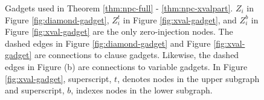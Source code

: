 \begin{figure}

	\caption{Gadgets used in Theorem \ref{thm:npc-full} - \ref{thm:npc-xvalpart}. $Z_i$ in Figure \ref{fig:diamond-gadget}, $Z_i^t$ in Figure \ref{fig:xval-gadget}, and $Z_i^b$ in Figure \ref{fig:xval-gadget} are the only zero-injection nodes.
	The dashed edges in Figure \ref{fig:diamond-gadget} and Figure \ref{fig:xval-gadget} are connections to clause gadgets. Likewise, the dashed edges in Figure (b) are connections to variable gadgets.  In Figure \ref{fig:xval-gadget},
	superscript, $t$, denotes nodes in the upper subgraph and superscript, $b$, indexes nodes in the lower subgraph.}
  
\label{fig:pmu-gadgets}
\end{figure}


